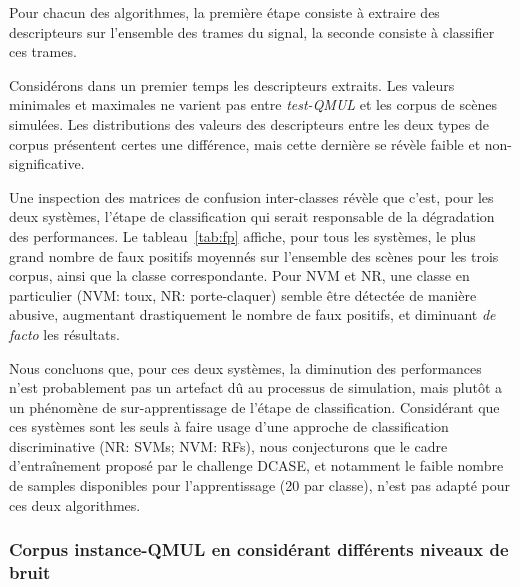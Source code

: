 Pour chacun des algorithmes, la première étape consiste à extraire des descripteurs sur l'ensemble des trames du signal, la seconde consiste à classifier ces trames.

Considérons dans un premier temps les descripteurs extraits. Les valeurs minimales et maximales ne varient pas entre \emph{test-QMUL} et les corpus de scènes simulées. Les distributions des valeurs des descripteurs entre les deux types de corpus présentent certes une différence, mais cette dernière se révèle faible et non-significative. 

Une inspection des matrices de confusion inter-classes révèle que c'est, pour les deux systèmes, l'étape de classification qui serait responsable de la dégradation des performances. Le tableau~\ref{tab:fp} affiche, pour tous les systèmes, le plus grand nombre de faux positifs moyennés sur l'ensemble des scènes pour les trois corpus, ainsi que la classe correspondante. Pour NVM et NR, une classe en particulier (NVM: toux, NR: porte-claquer) semble être détectée de manière abusive, augmentant drastiquement le nombre de faux positifs, et diminuant \emph{de facto} les résultats.

Nous concluons que, pour ces deux systèmes, la diminution des performances n'est probablement pas un artefact dû au processus de simulation, mais plutôt a un phénomène de sur-apprentissage de l'étape de classification. Considérant que ces systèmes sont les seuls à faire usage d'une approche de classification discriminative (NR: SVMs; NVM: RFs), nous conjecturons que le cadre d'entraînement proposé par le challenge DCASE, et notamment le faible nombre de samples disponibles pour l'apprentissage (20 par classe), n'est pas adapté pour ces deux algorithmes.

\subsubsection{Corpus instance-QMUL en considérant différents niveaux de bruit}

